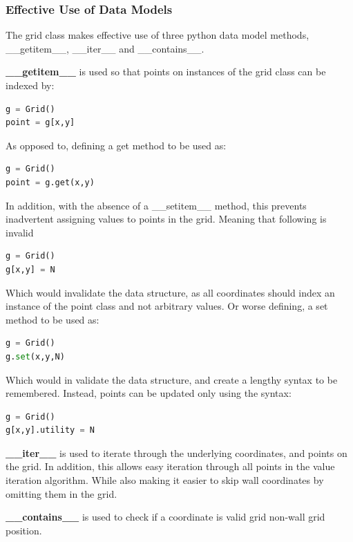 \documentclass[letterpaper, 11pt, journal, final]{IEEEtran}
\begin{document}
\subsubsection{Effective Use of Data Models}
The grid class makes effective use of three python data model methods, \_\_getitem\_\_, \_\_iter\_\_ and \_\_contains\_\_.

\textbf{\_\_getitem\_\_ }is used so that points on instances of the grid class can be indexed by:
\begin{lstlisting}[language=Python]
g = Grid() 
point = g[x,y]
\end{lstlisting}
As opposed to, defining a get method to be used as:
\begin{lstlisting}[language=Python]
g = Grid()
point = g.get(x,y)
\end{lstlisting}
In addition, with the absence of a \_\_setitem\_\_ method, this prevents inadvertent assigning values to points in the grid. Meaning that following is invalid
\begin{lstlisting}[language=Python]
g = Grid()
g[x,y] = N
\end{lstlisting}
Which would invalidate the data structure, as all coordinates should index an instance of the point class and not arbitrary values. Or worse defining, a set method to be used as:
\begin{lstlisting}[language=Python]
g = Grid()
g.set(x,y,N)
\end{lstlisting}
Which would in validate the data structure, and create a lengthy syntax to be remembered. Instead, points can be updated only using the syntax: 
\begin{lstlisting}[language=Python]
g = Grid()
g[x,y].utility = N
\end{lstlisting}

\textbf{\_\_iter\_\_} is used to iterate through the underlying coordinates, and points on the grid. In addition, this allows easy iteration through all points in the value iteration algorithm. While also making it easier to skip wall coordinates by omitting them in the grid.

\textbf{\_\_contains\_\_} is used to check if a coordinate is valid grid non-wall grid position.
\end{document}
